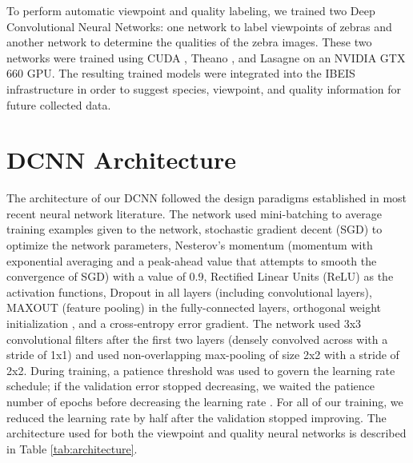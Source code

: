 To perform automatic viewpoint and quality labeling, we trained two Deep Convolutional Neural Networks: one network to label viewpoints of zebras and another network to determine the qualities of the zebra images.  These two networks were trained using CUDA \cite{nickolls_scalable_2008}, Theano \cite{bergstra_theano:_2010, bastien_theano:_2012}, and Lasagne \cite{_https://github.com/lasagne/lasagne_2015} on an NVIDIA GTX 660 GPU.  The resulting trained models were integrated into the IBEIS infrastructure in order to suggest species, viewpoint, and quality information for future collected data.

\section{DCNN Architecture}
The architecture of our DCNN followed the design paradigms established in most recent neural network literature.  The network used mini-batching \cite{lecun_efficient_1993, hinton_fast_2006} to average training examples given to the network, stochastic gradient decent (SGD) \cite{gardner_learning_1984, tsitsiklis_distributed_1986} to optimize the network parameters, Nesterov's momentum \cite{nesterov_method_1983} (momentum with exponential averaging and a peak-ahead value that attempts to smooth the convergence of SGD) with a value of 0.9, Rectified Linear Units (ReLU) \cite{krizhevsky_imagenet_2012, nair_rectified_2010, dahl_improving_2013} as the activation functions, Dropout \cite{hinton_improving_2012} in all layers (including convolutional layers), MAXOUT \cite{goodfellow_maxout_2013} (feature pooling) in the fully-connected layers, orthogonal weight initialization \cite{saxe_exact_2013}, and a cross-entropy error gradient.  The network used 3x3 convolutional filters after the first two layers (densely convolved across with a stride of 1x1) and used non-overlapping max-pooling of size 2x2 with a stride of 2x2.  During training, a patience threshold was used to govern the learning rate schedule; if the validation error stopped decreasing, we waited the patience number of epochs before decreasing the learning rate \cite{fahlman_cascade-correlation_1989}.  For all of our training, we reduced the learning rate by half after the validation stopped improving.  The architecture used for both the viewpoint and quality neural networks is described in Table \ref{tab:architecture}.

